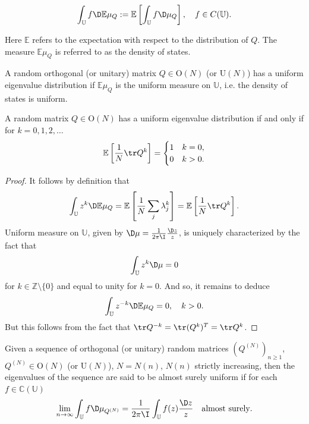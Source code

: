 \begin{align}
\int_{\mathbb U} f \D \mathbb E \mu_Q : = \mathbb E \left[ \int_{\mathbb U} f \D \mu_Q \right],  \quad f \in C(\mathbb U).
\end{align}

Here $\mathbb E$ refers to the expectation with respect to the distribution of $Q$. The measure $\mathbb E \mu_Q$ is referred to as the density of states.

\begin{definition}
A random orthogonal (or unitary) matrix $Q \in \mathrm{O}(N)$ (or $\mathrm{U}(N)$) has a uniform eigenvalue distribution if $\mathbb E \mu_Q$ is the uniform measure on $\mathbb U$, i.e. the density of states is uniform.
\end{definition}

\begin{theorem}
A random matrix $Q \in \mathrm O(N)$ has a uniform eigenvalue distribution if and only if for $k = 0,1,2,\ldots$
\begin{align}
\mathbb E \left[ \frac{1}{N} \tr Q^k \right] = \begin{cases} 1 & k = 0,\\ 0 & k > 0.\end{cases}
\end{align}
\end{theorem}

\begin{proof}
It follows by definition that
\begin{align}
\int_{\mathbb U} z^k \D \mathbb E \mu_Q = \mathbb E \left[\frac{1}{N} \sum_j \lambda_j^k \right] = \mathbb E\left[ \frac{1}{N} \tr Q^k \right].
\end{align}
Uniform measure on $\mathbb U$, given by $\D \mu = \frac{1}{2\pi \I} \frac{\D z}{z}$, is uniquely characterized by the fact that
\begin{align}
\int_{\mathbb U} z^k \D \mu = 0
\end{align}
for $k \in \mathbb Z \setminus \{0\}$ and equal to unity for $k = 0$.  And so, it remains to deduce
\begin{align}
\int_{\mathbb U} z^{-k} \D \mathbb E \mu_Q = 0, \quad k > 0.
\end{align}
But this follows from the fact that $\tr Q^{-k} = \tr (Q^k)^T = \tr Q^k$.
\end{proof}

\begin{definition}
Given a sequence of orthogonal (or unitary) random matrices $(Q^{(N)})_{n \geq 1}$, $Q^{(N)} \in \mathrm O(N)$ (or $\mathrm{U}(N)$), $N = N(n)$, $N(n)$ strictly increasing, then the eigenvalues of the sequence are said to be almost surely uniform if for each $f \in \mathbb C(\mathbb U)$
\begin{align}
\lim_{n \to \infty} \int_{\mathbb U} f \D \mu_{Q\pp N}  = \frac{1}{2 \pi \I}\int_{\mathbb U} f(z) \frac{\D z}{z} \quad \text{almost surely}.
\end{align}
\end{definition}

